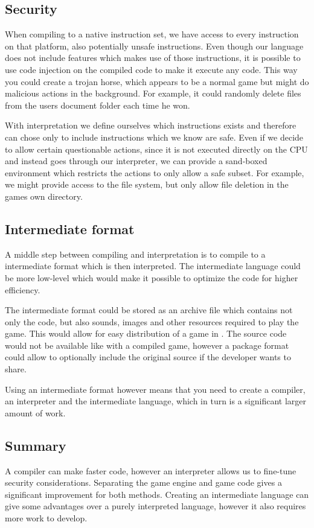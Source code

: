 \subsection{Security}
When compiling to a native instruction set, we have access to every instruction
on that platform, also potentially unsafe instructions. Even though our
language does not include features which makes use of those instructions, it is
possible to use code injection on the compiled code to make it execute any code.
This way you could create a trojan horse, which appears to be a normal game but
might do malicious actions in the background.  For example, it could randomly
delete files from the users document folder each time he won.

With interpretation we define ourselves which instructions exists and therefore
can chose only to include instructions which we know are safe.  Even if we
decide to allow certain questionable actions, since it is not executed directly
on the CPU and instead goes through our interpreter, we can provide a sand-boxed
environment which restricts the actions to only allow a safe subset.  For
example, we might provide access to the file system, but only allow file
deletion in the games own directory.

\subsection{Intermediate format}
A middle step between compiling and interpretation is to compile to a
intermediate format which is then interpreted. The intermediate language could
be more low-level which would make it possible to optimize the code for higher
efficiency.

The intermediate format could be stored as an archive file which contains not
only the code, but also sounds, images and other resources required to play the
game. This would allow for easy distribution of a game in \productname{}. The
source code would not be available like with a compiled game, however a package
format could allow to optionally include the original source if the developer
wants to share.

Using an intermediate format however means that you need to create a compiler,
an interpreter and the intermediate language, which in turn is a significant
larger amount of work.

\subsection{Summary}
A compiler can make faster code, however an interpreter allows us to fine-tune
security considerations.  Separating the game engine and game code gives a
significant improvement for both methods.  Creating an intermediate language can
give some advantages over a purely interpreted language, however it also
requires more work to develop.

